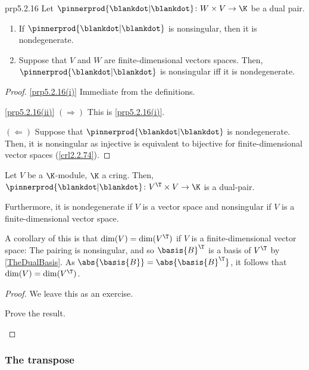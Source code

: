 \begin{prp}{}{prp5.2.16}
	Let $\pinnerprod{\blankdot |\blankdot}\colon W\times V\rightarrow \K$ be a dual pair.
	\begin{enumerate}
		\item \label{prp5.2.16(i)}If $\pinnerprod{\blankdot |\blankdot}$ is nonsingular, then it is nondegenerate.
		\item \label{prp5.2.16(ii)}Suppose that $V$ and $W$ are finite-dimensional vectors spaces.  Then, $\pinnerprod{\blankdot |\blankdot}$ is nonsingular iff it is nondegenerate.
	\end{enumerate}
	\begin{proof}
		\cref{prp5.2.16(i)} Immediate from the definitions.
		
		\blni
		\cref{prp5.2.16(ii)} $(\Rightarrow )$ This is \cref{prp5.2.16(i)}.
		
		$(\Leftarrow )$ Suppose that $\pinnerprod{\blankdot |\blankdot}$ is nondegenerate.  Then, it is nonsingular as injective is equivalent to bijective for finite-dimensional vector spaces (\cref{crl2.2.74}).
	\end{proof}
\end{prp}
\begin{prp}{}{}
	Let $V$ be a $\K$-module, $\K$ a cring.  Then, $\pinnerprod{\blankdot |\blankdot}\colon V^{\T}\times V\rightarrow \K$ is a dual-pair.
	
	Furthermore, it is nondegenerate if $V$ is a vector space and nonsingular if $V$ is a finite-dimensional vector space.
	\begin{rmk}
		A corollary of this is that $\dim (V)=\dim (V^{\T})$ if $V$ is a finite-dimensional vector space:  The pairing is nonsingular, and so $\basis{B}^{\T}$ is a basis of $V^{\T}$ by \cref{TheDualBasis}.  As $\abs{\basis{B}}=\abs{\basis{B}^{\T}}$, it follows that $\dim (V)=\dim (V^{\T})$.
	\end{rmk}
	\begin{proof}
		We leave this as an exercise.
		\begin{exr}[breakable=false]{}{}
			Prove the result.
		\end{exr}
	\end{proof}
\end{prp}

\subsubsection{The transpose}

